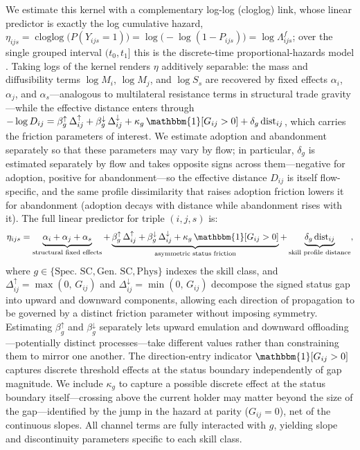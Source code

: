 \documentclass[11pt, letterpaper]{article} %
\newcommand{\parencite}[1]{\cite{#1}}
\begin{document}
We estimate this kernel with a complementary log-log (cloglog) link, whose linear predictor is exactly the log cumulative hazard, $\eta_{ijs} = \operatorname{cloglog}\big(P(Y_{ijs}=1)\big) = \log\big(-\log(1-P_{ijs})\big) = \log \Lambda^{f}_{ijs}$; over the single grouped interval $(t_0,t_1]$ this is the discrete-time proportional-hazards model \parencite{jenkins_easy_1995}. Taking logs of the kernel renders $\eta$ additively separable: the mass and diffusibility terms $\log M_i$, $\log M_j$, and $\log S_s$ are recovered by fixed effects $\alpha_i$, $\alpha_j$, and $\alpha_s$---analogous to multilateral resistance terms in structural trade gravity \parencite{fally_structural_2015, egger_glm_2015}---while the effective distance enters through $-\log D_{ij} = \beta^{\uparrow}_{g}\,\Delta^{\uparrow}_{ij} + \beta^{\downarrow}_{g}\,\Delta^{\downarrow}_{ij} + \kappa_{g}\,\mathbbm{1}[G_{ij}>0] + \delta_{g}\,\mathrm{dist}_{ij}$, which carries the friction parameters of interest. We estimate adoption and abandonment separately so that these parameters may vary by flow; in particular, $\delta_g$ is estimated separately by flow and takes opposite signs across them---negative for adoption, positive for abandonment---so the effective distance $D_{ij}$ is itself flow-specific, and the same profile dissimilarity that raises adoption friction lowers it for abandonment (adoption decays with distance while abandonment rises with it). The full linear predictor for triple $(i,j,s)$ is:
%
\begin{equation}
\eta_{ijs} = \underbrace{\alpha_i + \alpha_j + \alpha_s}_{\text{structural fixed effects}} + \underbrace{\beta^{\uparrow}_{g}\,\Delta^{\uparrow}_{ij} + \beta^{\downarrow}_{g}\,\Delta^{\downarrow}_{ij} + \kappa_{g}\,\mathbbm{1}[G_{ij}>0]}_{\text{asymmetric status friction}} + \underbrace{\delta_{g}\,\mathrm{dist}_{ij}}_{\text{skill profile distance}},
\label{eq:gravity_main}
\end{equation}
%
where $g \in \{\text{Spec.\ SC}, \text{Gen.\ SC}, \text{Phys}\}$ indexes the skill class, and $\Delta^{\uparrow}_{ij} = \max(0,\, G_{ij})$ and $\Delta^{\downarrow}_{ij} = \min(0,\, G_{ij})$ decompose the signed status gap into upward and downward components, allowing each direction of propagation to be governed by a distinct friction parameter without imposing symmetry. Estimating $\beta^{\uparrow}_{g}$ and $\beta^{\downarrow}_{g}$ separately lets upward emulation and downward offloading---potentially distinct processes---take different values rather than constraining them to mirror one another. The direction-entry indicator $\mathbbm{1}[G_{ij}>0]$ captures discrete threshold effects at the status boundary independently of gap magnitude. We include $\kappa_g$ to capture a possible discrete effect at the status boundary itself---crossing above the current holder may matter beyond the size of the gap---identified by the jump in the hazard at parity ($G_{ij}=0$), net of the continuous slopes. All channel terms are fully interacted with $g$, yielding slope and discontinuity parameters specific to each skill class.
 
\end{document}
